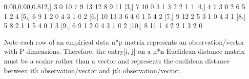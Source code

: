 \documentclass[
]{article}
\newenvironment{Shaded}{\begin{snugshade}}{\end{snugshade}}
\newcommand{\DecValTok}[1]{\textcolor[rgb]{0.00,0.00,0.81}{#1}}
\newcommand{\NormalTok}[1]{#1}
\begin{document}
\begin{Shaded}
\begin{Highlighting}[]
\NormalTok{ [}\DecValTok{2}\NormalTok{,]    }\DecValTok{3}    \DecValTok{0}   \DecValTok{10}    \DecValTok{7}    \DecValTok{9}   \DecValTok{13}   \DecValTok{12}    \DecValTok{8}    \DecValTok{9}    \DecValTok{11}
\NormalTok{ [}\DecValTok{3}\NormalTok{,]    }\DecValTok{7}   \DecValTok{10}    \DecValTok{0}    \DecValTok{3}    \DecValTok{1}    \DecValTok{3}    \DecValTok{2}    \DecValTok{2}    \DecValTok{1}     \DecValTok{1}
\NormalTok{ [}\DecValTok{4}\NormalTok{,]    }\DecValTok{4}    \DecValTok{7}    \DecValTok{3}    \DecValTok{0}    \DecValTok{2}    \DecValTok{6}    \DecValTok{5}    \DecValTok{1}    \DecValTok{2}     \DecValTok{4}
\NormalTok{ [}\DecValTok{5}\NormalTok{,]    }\DecValTok{6}    \DecValTok{9}    \DecValTok{1}    \DecValTok{2}    \DecValTok{0}    \DecValTok{4}    \DecValTok{3}    \DecValTok{1}    \DecValTok{0}     \DecValTok{2}
\NormalTok{ [}\DecValTok{6}\NormalTok{,]   }\DecValTok{10}   \DecValTok{13}    \DecValTok{3}    \DecValTok{6}    \DecValTok{4}    \DecValTok{0}    \DecValTok{1}    \DecValTok{5}    \DecValTok{4}     \DecValTok{2}
\NormalTok{ [}\DecValTok{7}\NormalTok{,]    }\DecValTok{9}   \DecValTok{12}    \DecValTok{2}    \DecValTok{5}    \DecValTok{3}    \DecValTok{1}    \DecValTok{0}    \DecValTok{4}    \DecValTok{3}     \DecValTok{1}
\NormalTok{ [}\DecValTok{8}\NormalTok{,]    }\DecValTok{5}    \DecValTok{8}    \DecValTok{2}    \DecValTok{1}    \DecValTok{1}    \DecValTok{5}    \DecValTok{4}    \DecValTok{0}    \DecValTok{1}     \DecValTok{3}
\NormalTok{ [}\DecValTok{9}\NormalTok{,]    }\DecValTok{6}    \DecValTok{9}    \DecValTok{1}    \DecValTok{2}    \DecValTok{0}    \DecValTok{4}    \DecValTok{3}    \DecValTok{1}    \DecValTok{0}     \DecValTok{2}
\NormalTok{[}\DecValTok{10}\NormalTok{,]    }\DecValTok{8}   \DecValTok{11}    \DecValTok{1}    \DecValTok{4}    \DecValTok{2}    \DecValTok{2}    \DecValTok{1}    \DecValTok{3}    \DecValTok{2}     \DecValTok{0}
\end{Highlighting}
\end{Shaded}

Note each row of an empirical data n*p matrix represents an
observation/vector with P dimensions. Therefore, the entry{[}i, j{]} on
a n*n Euclidean distance matrix must be a scalar rather than a vector
and represents the euclidean distance between ith observation/vector and
jth observation/vector.
\end{document}
